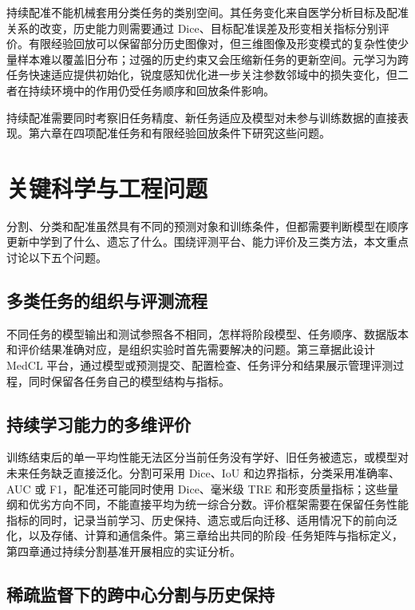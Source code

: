持续配准不能机械套用分类任务的类别空间。其任务变化来自医学分析目标及配准关系的改变，历史能力则需要通过 Dice、目标配准误差及形变相关指标分别评价。有限经验回放可以保留部分历史图像对，但三维图像及形变模式的复杂性使少量样本难以覆盖旧分布；过强的历史约束又会压缩新任务的更新空间。元学习为跨任务快速适应提供初始化，锐度感知优化进一步关注参数邻域中的损失变化，但二者在持续环境中的作用仍受任务顺序和回放条件影响\cite{hadsell2020embracing,wang2024samcl}。

持续配准需要同时考察旧任务精度、新任务适应及模型对未参与训练数据的直接表现。第六章在四项配准任务和有限经验回放条件下研究这些问题。

\section{关键科学与工程问题}
\label{sec:intro-challenges}

分割、分类和配准虽然具有不同的预测对象和训练条件，但都需要判断模型在顺序更新中学到了什么、遗忘了什么。围绕评测平台、能力评价及三类方法，本文重点讨论以下五个问题。

\subsection{多类任务的组织与评测流程}
\label{subsec:intro-challenge-platform}

不同任务的模型输出和测试参照各不相同，怎样将阶段模型、任务顺序、数据版本和评价结果准确对应，是组织实验时首先需要解决的问题。第三章据此设计 MedCL 平台，通过模型或预测提交、配置检查、任务评分和结果展示管理评测过程，同时保留各任务自己的模型结构与指标。

\subsection{持续学习能力的多维评价}
\label{subsec:intro-challenge-evaluation}

训练结束后的单一平均性能无法区分当前任务没有学好、旧任务被遗忘，或模型对未来任务缺乏直接泛化。分割可采用 Dice、IoU 和边界指标，分类采用准确率、AUC 或 F1，配准还可能同时使用 Dice、毫米级 TRE 和形变质量指标；这些量纲和优劣方向不同，不能直接平均为统一综合分数。评价框架需要在保留任务性能指标的同时，记录当前学习、历史保持、遗忘或后向迁移、适用情况下的前向泛化，以及存储、计算和通信条件。第三章给出共同的阶段--任务矩阵与指标定义，第四章通过持续分割基准开展相应的实证分析。

\subsection{稀疏监督下的跨中心分割与历史保持}
\label{subsec:intro-challenge-scribble}


